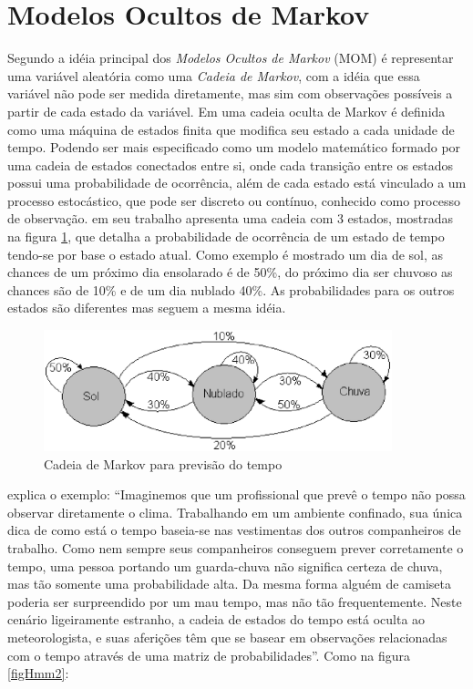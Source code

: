 \section{Modelos Ocultos de Markov}
Segundo  a idéia principal dos \textit{Modelos Ocultos de Markov} (MOM) é representar uma variável aleatória como uma \textit{Cadeia de Markov}, com a idéia que essa variável não pode ser medida diretamente, mas sim com observações possíveis a partir de cada estado da variável. Em  uma cadeia oculta de Markov é definida como uma máquina de estados finita que modifica seu estado a cada unidade de tempo. Podendo ser mais especificado como um modelo matemático formado por uma cadeia de estados conectados entre si, onde cada transição entre os estados possui uma probabilidade de ocorrência, além de cada estado está vinculado a um processo estocástico, que pode ser discreto ou contínuo, conhecido como processo de observação.
 em seu trabalho apresenta uma cadeia com 3 estados, mostradas na figura \ref{FigHmm}, que detalha a probabilidade de ocorrência de um estado de tempo tendo-se por base o estado atual. Como exemplo é mostrado um dia de sol, as chances de um próximo dia ensolarado é de 50{\%}, do próximo dia ser chuvoso as chances são de 10{\%} e de um dia nublado 40{\%}. As probabilidades para os outros estados são diferentes mas seguem a mesma idéia.

\begin{figure}[H]
\includegraphics[width=0.9\textwidth]{graficos/markov.eps}
\caption{Cadeia de Markov para previsão do tempo}
\label{FigHmm}
\end{figure}

 explica o exemplo:
“Imaginemos que um profissional que prevê o tempo não possa observar diretamente o clima. Trabalhando em um ambiente confinado, sua única dica de como está o tempo baseia-se nas vestimentas dos outros companheiros de trabalho. Como nem sempre seus companheiros conseguem prever corretamente o tempo, uma pessoa portando um guarda-chuva não significa certeza de chuva, mas tão somente uma probabilidade alta. Da mesma forma alguém de camiseta poderia ser surpreendido por um mau tempo, mas não tão frequentemente. Neste cenário ligeiramente estranho, a cadeia de estados do tempo está oculta ao meteorologista, e suas aferições têm que se basear em observações relacionadas com o tempo através de uma matriz de probabilidades”. Como na figura \ref{figHmm2}:

